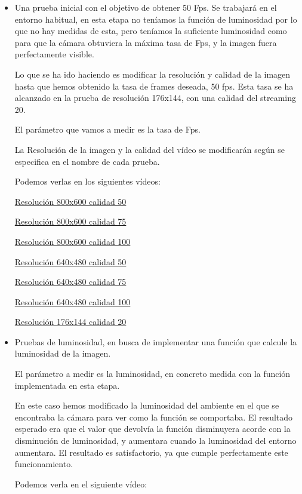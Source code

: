 \begin{itemize}
	\item Una prueba inicial con el objetivo de obtener 50 Fps. Se trabajará en el entorno habitual, en esta etapa no teníamos la función de luminosidad por lo que no hay medidas de esta, pero teníamos la suficiente luminosidad como para que la cámara obtuviera la máxima tasa de Fps, y la imagen fuera perfectamente visible.
	
Lo que se ha ido haciendo es modificar la resolución y calidad de la imagen hasta que hemos obtenido la tasa de frames deseada, 50 fps. Esta tasa se ha alcanzado en la prueba de resolución 176x144, con una calidad del streaming 20.

El parámetro que vamos a medir es la tasa de Fps.

La Resolución de la imagen y la calidad del vídeo se modificarán según se especifica en el nombre de cada prueba. 

Podemos verlas en los siguientes vídeos:
	
	\href{https://youtu.be/r73s9I_8SiI}{Resolución 800x600 calidad 50}
	
	\href{https://youtu.be/rdv0COnl-G4}{Resolución 800x600 calidad 75}
	
	\href{https://youtu.be/tGip7sWjD8E}{Resolución 800x600 calidad 100}
	
	\href{https://youtu.be/saFDDQNjsEs}{Resolución 640x480 calidad 50}
	
	\href{https://youtu.be/a3ZxLQB37k0}{Resolución 640x480 calidad 75}
	
	\href{https://youtu.be/zu8rWr31fuQ}{Resolución 640x480 calidad 100}
	
	\href{https://youtu.be/WzJjXKeKpaI}{Resolución 176x144 calidad 20}	
	
	\item Pruebas de luminosidad, en busca de implementar una función que calcule la luminosidad de la imagen. 

El parámetro a medir es la luminosidad, en concreto medida con la
función implementada en esta etapa.

En este caso hemos modificado la luminosidad del ambiente en el que se encontraba la cámara para ver como la función se comportaba. El resultado esperado era que el valor que devolvía la función disminuyera acorde con la disminución de luminosidad, y aumentara cuando la luminosidad del entorno aumentara. El resultado es satisfactorio, ya que cumple perfectamente este funcionamiento.
	
	Podemos verla en el siguiente vídeo:
	

\end{itemize}
